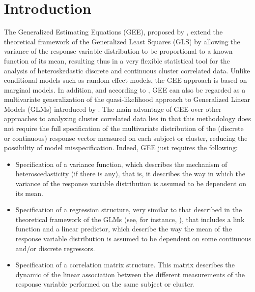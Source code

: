 ﻿\section{Introduction}
The Generalized Estimating Equations (GEE), proposed by \cite{LZ86}, extend the theoretical framework of the Generalized Least Squares (GLS) by allowing the variance of the response variable distribution to be proportional to a known function of its mean, resulting thus in a very flexible statistical tool for the analysis of heteroskedastic discrete and continuous cluster correlated data. Unlike conditional models such as random-effect models, the GEE approach is based on marginal models. In addition, and according to \cite{LF08}, GEE can also be regarded as a multivariate generalization of the quasi-likelihood approach to Generalized Linear Models (GLMs) introduced by \cite{W74}. The main advantage of GEE over other approaches to analyzing cluster correlated data lies in that this methodology does not require the full specification of the multivariate distribution of the (discrete or continuous) response vector measured on each subject or cluster, reducing the possibility of model misspecification. Indeed, GEE just requires the following:

\begin{itemize}
\item Specification of a variance function, which describes the mechanism of heteroscedasticity (if there is any), that is, it describes the way in which the variance of the response variable distribution is assumed to be dependent on its mean.
\item Specification of a regression structure, very similar to that described in the theoretical framework of the GLMs (see, for instance, \cite{MN89}), that includes a link function and a linear predictor, which describe the way the mean of the response variable distribution is assumed to be dependent on some continuous and/or discrete regressors.
\item Specification of a correlation matrix structure. This matrix describes the dynamic of the linear association between the different measurements of the response variable performed on the same subject or cluster.
\end{itemize}

